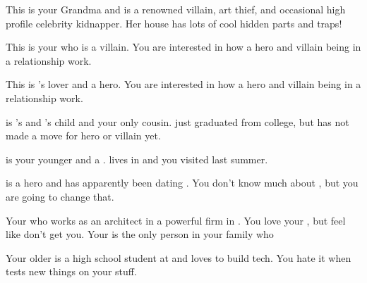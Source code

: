 \documentclass[char]{LRSguildcamp1}
\begin{document}
\begin{contacts}
	\contact{\cGrandma{}} This is your Grandma and is a renowned villain, art thief, and occasional high profile celebrity kidnapper. Her house has lots of cool hidden parts and traps!
	
	\contact{\cOldest{}} This is your \cOldest{\uncle} who is a villain.  You are interested in how a hero and villain being in a relationship work. 
	
	\contact{\cOS{}} This is \cOldest{}'s lover and a hero. You are interested in how a hero and villain being in a relationship work. 
	
	\contact{\cGrad{}} \cGrad{} is \cOldest{}'s and \cOS{}'s child and your only cousin. \cGrad{\They} just graduated from college, but has not made a move for hero or villain yet. 
	
	\contact{\cYoungest{}} \cYoungest{} is your younger \cYoungest{\uncle} and a \cYoungest{\hero}. \cYoungest{} lives in \pCityYoungest{} and you visited \cYoungest{\them} last summer.  
	
	\contact{\cYS{}} \cYS{} is a hero and has apparently been dating \cYoungest{}. You don't know much about \cYS{\them}, but you are going to change that. 
	
	\contact{\cArchitect{}} Your \cArchitect{\parent} who works as an architect in a powerful firm in \pCityArchitect{}.  You love your \cArchitect{\parent}, but feel like \cArchitect{\they} don't get you. Your \cArchitect{\parent} is the only person in your family who 
	
	 	\contact{\cTeen{}} Your older \cTeen{\sibling} is a high school student at \pNormalSchool{} and loves to build tech. You hate it when \cTeen{} tests new things on your stuff. 
		
\end{contacts}
\end{document}
